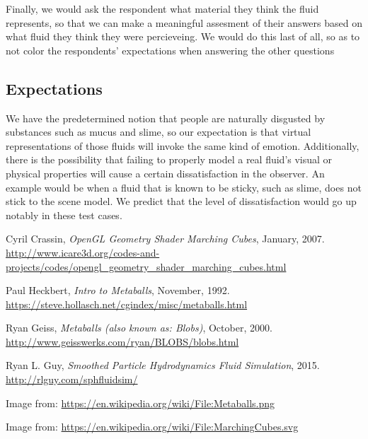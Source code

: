 \documentclass{article}
\begin{document}
\begin{multicols}{2}
            Finally, we would ask the respondent what material they think the fluid represents, so that we can make a meaningful assesment of their answers based on what fluid they think they were percieveing. We would do this last of all, so as to not color the respondents' expectations when answering the other questions

        \subsection{Expectations}

            We have the predetermined notion that people are naturally disgusted by substances such as mucus and slime, so our expectation is that virtual representations of those fluids will invoke the same kind of emotion.
            Additionally, there is the possibility that failing to properly model a real fluid's visual or physical properties will cause a certain dissatisfaction in the observer. An example would be when a fluid that is known to be sticky, such as slime, does not stick to the scene model. We predict that the level of dissatisfaction would go up notably in these test cases.

	\end{multicols}

\begin{thebibliography}{9}

	Cyril Crassin,
	\textit{OpenGL Geometry Shader Marching Cubes},
	January,
	2007.
	\\
	\url{http://www.icare3d.org/codes-and-projects/codes/opengl_geometry_shader_marching_cubes.html}

	Paul Heckbert,
	\textit{Intro to Metaballs},
	November,
	1992.
	\\
	\url{https://steve.hollasch.net/cgindex/misc/metaballs.html}
	
	Ryan Geiss,
	\textit{Metaballs (also known as: Blobs)},
	October,
	2000.
	\\
	\url{http://www.geisswerks.com/ryan/BLOBS/blobs.html}

	Ryan L. Guy,
	\textit{Smoothed Particle Hydrodynamics Fluid Simulation},
	2015.
	\\
	\url{http://rlguy.com/sphfluidsim/}

	Image from: \url{https://en.wikipedia.org/wiki/File:Metaballs.png}

  Image from: \url{https://en.wikipedia.org/wiki/File:MarchingCubes.svg}

\end{thebibliography}
\end{document}
